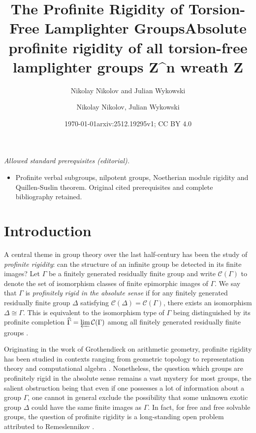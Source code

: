 \documentclass{amsart}
\title{The Profinite Rigidity of Torsion-Free Lamplighter Groups}
\author{Nikolay Nikolov and Julian Wykowski}
\date{\today}
\title{Absolute profinite rigidity of all torsion-free lamplighter groups Z\textasciicircum{}n wreath Z}
\author{Nikolay Nikolov, Julian Wykowski}
\date{arxiv:2512.19295v1; CC BY 4.0}
\numberwithin{theorem}{section}
\numberwithin{equation}{section}
\newcommand{\hG}{\widehat{\Gamma}}
\begin{document}
\maketitle
\noindent\textit{Allowed standard prerequisites (editorial).}\begin{itemize}
\item Profinite verbal subgroups, nilpotent groups, Noetherian module rigidity and Quillen-Suslin theorem. Original cited prerequisites and complete bibliography retained.
\end{itemize}\medskip
\section{Introduction}

A central theme in group theory over the last half-century has been the study of \emph{profinite rigidity}: can the structure of an infinite group be detected in its finite images? Let $\Gamma$ be a finitely generated residually finite group and write $\mathcal{C}(\Gamma)$ to denote the set of isomorphism classes of finite epimorphic images of $\Gamma$. We say that $\Gamma$ is \emph{profinitely rigid in the absolute sense} if for any finitely generated residually finite group $\Delta$ satisfying $\mathcal{C}(\Delta) = \mathcal{C}(\Gamma)$, there exists an isomorphism $\Delta \cong \Gamma$. This is equivalent to the isomorphism type of $\Gamma$ being distinguished by its profinite completion $\hG = \varprojlim{\mathcal{C}(\Gamma)}$ among all finitely generated residually finite groups \cite{Dixon1982}.

Originating in the work of Grothendieck on arithmetic geometry, profinite rigidity has been studied in contexts ranging from geometric topology to representation theory and computational algebra \cite{Grothendieck1970, Bridson2004, Bridson2015, Wilton2019}. Nonetheless, the question which groups are profinitely rigid in the absolute sense remains a vast mystery for most groups, the salient obstruction being that even if one possesses a lot of information about a group $\Gamma$, one cannot in general exclude the possibility that some unknown exotic group $\Delta$ could have the same finite images as $\Gamma$. In fact, for free and free solvable groups, the question of profinite rigidity is a long-standing open problem attributed to Remeslennikov \cite[Question 15]{Noskov1982}.
\end{document}
